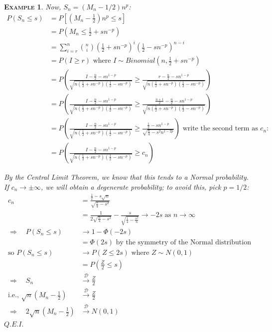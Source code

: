 \documentclass[12pt,a4paper]{article}
\newtheorem{example}{\textsc{Example}}[section]
\begin{document}
\begin{example}
Now, $S_n = (M_n - 1/2)n^p$:
\begin{align*}
P(S_n\leq s) &= P\left[ \left(M_n-\frac{1}{2}\right)n^p \leq s\right]\\
&= P\left(M_n \leq \frac{1}{2} + sn^{-p}\right)\\
&= \sum_{i=r}^n \binom{n}{i} \left(\frac{1}{2}+sn^{-p}\right)^i\left(\frac{1}{2}-sn^{-p}\right)^{n-i}\\
&= P(I\geq r) \mbox{ where $I\sim Binomial\left(n,\frac{1}{2}+sn^{-p}\right)$}\\
&= P\left(\frac{I-\frac{n}{2}-sn^{1-p}}{\sqrt{n\left(\frac{1}{2} + sn^{-p}\right)\left(\frac{1}{2}-sn^{-p}\right)}} \geq \frac{r-\frac{n}{2}-sn^{1-p}}{\sqrt{n\left(\frac{1}{2} + sn^{-p}\right)\left(\frac{1}{2}-sn^{-p}\right)}}\right)\\
&= P\left(\frac{I-\frac{n}{2}-sn^{1-p}}{\sqrt{n\left(\frac{1}{2} + sn^{-p}\right)\left(\frac{1}{2}-sn^{-p}\right)}} \geq \frac{\frac{n+1}{2}-\frac{n}{2} - sn^{1-p}}{\sqrt{n\left(\frac{1}{2}+sn^{-p}\right)\left(\frac{1}{2}-sn^{-p}\right)}}\right)\\
&=  P\left(\frac{I-\frac{n}{2}-sn^{1-p}}{\sqrt{n\left(\frac{1}{2} + sn^{-p}\right)\left(\frac{1}{2}-sn^{-p}\right)}} \geq \frac{\frac{1}{2}-sn^{1-p}}{\sqrt{\frac{n}{4}-s^2n^{1-2p}}}\right)\mbox{ write the second term as $c_n$:}\\
&= P\left(\frac{I-\frac{n}{2}-sn^{1-p}}{\sqrt{n\left(\frac{1}{2} + sn^{-p}\right)\left(\frac{1}{2}-sn^{-p}\right)}} \geq c_n\right)
\end{align*}

By the Central Limit Theorem, we know that this tends to a Normal probability. If $c_n\to\pm\infty$, we will obtain a degenerate probability; to avoid this, pick $p=1/2$:
\begin{align*}
c_n &= \frac{\frac{1}{2}-s\sqrt{n}}{\sqrt{\frac{n}{4}-s^2}}\\
&= \frac{1}{2\sqrt{\frac{n}{4}-s^2}} - \frac{s}{\sqrt{\frac{1}{4}-\frac{s^2}{n}}} \to -2s \mbox{ as $n\to\infty$}\\
\Rightarrow\quad P(S_n\leq s) &\to 1-\Phi(-2s)\\
&=\Phi(2s)\mbox{ by the symmetry of the Normal distribution}\\
\mbox{so } P(S_n\leq s)&\to P(Z\leq 2s)\mbox{ where $Z\sim N(0,1)$}\\
&= P\left(\frac{Z}{2}\leq s\right)\\
\Rightarrow\quad S_n &\xrightarrow{\mathscr{D}} \frac{Z}{2}\\
\mbox{i.e., } \sqrt{n}\left(M_n - \frac{1}{2}\right) &\xrightarrow{\mathscr{D}} \frac{Z}{2}\\
\Rightarrow\quad 2\sqrt{n}\left(M_n - \frac{1}{2}\right) &\xrightarrow{\mathscr{D}} N(0,1)
\end{align*}\hfill$Q.E.I.$

\end{example}
\end{document}
